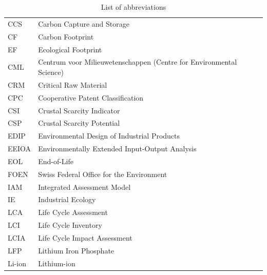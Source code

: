 \documentclass[a4paper,fleqn]{cas-dc}
\begin{document}
\begin{table}[!htbp]
	\centering
	\caption{List of abbreviations}\label{tab:abbreviations}
	\begin{tabular}{ll}
		\toprule
		CCS	              & Carbon Capture and Storage                                          \\
		CF                & Carbon Footprint                                                    \\
		EF                & Ecological Footprint                                                \\
		CML               & Centrum voor Milieuwetenschappen (Centre for Environmental Science) \\
		CRM               & Critical Raw Material                                               \\
		CPC               & Cooperative Patent Classification                                   \\
		CSI               & Crustal Scarcity Indicator                                          \\
		CSP               & Crustal Scarcity Potential                                          \\
		EDIP              & Environmental Design of Industrial Products                         \\
		EEIOA             & Environmentally Extended Input-Output Analysis                      \\
		EOL               & End-of-Life                                                         \\
		FOEN              & Swiss Federal Office for the Environment                            \\
		IAM               & Integrated Assessment Model                                         \\
		IE                & Industrial Ecology                                                  \\
		LCA               & Life Cycle Assessment                                               \\
		LCI               & Life Cycle Inventory                                                \\
		LCIA              & Life Cycle Impact Assessment                                        \\
		LFP               & Lithium Iron Phosphate                                              \\
		Li-ion            & Lithium-ion                                                         \\

\end{tabular}
\end{table}
\end{document}
